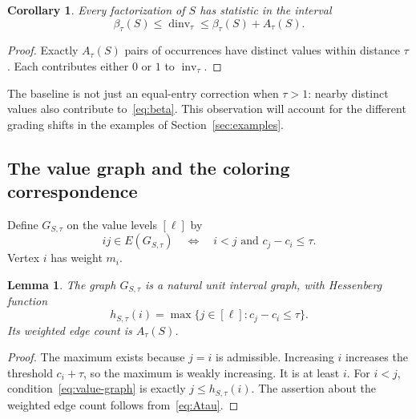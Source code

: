 \documentclass[11pt,reqno]{amsart}
\newcommand{\inv}{\operatorname{inv}}
\newcommand{\dinv}{\operatorname{dinv}}
\newtheorem{lemma}[theorem]{Lemma}
\newtheorem{corollary}[theorem]{Corollary}
\theoremstyle{definition}
\theoremstyle{remark}
\numberwithin{equation}{section}
\begin{document}
\begin{corollary}\label{cor:support}
Every factorization of $S$ has statistic in the interval
\[
 \beta_\tau(S)\leq\dinv_\tau\leq\beta_\tau(S)+A_\tau(S).
\]
\end{corollary}
\begin{proof}
Exactly $A_\tau(S)$ pairs of occurrences have distinct values within
distance $\tau$.  Each contributes either $0$ or $1$ to
$\inv_\tau$.
\end{proof}

The baseline is not just an equal-entry correction when $\tau>1$:
nearby distinct values also contribute to~\eqref{eq:beta}.  This
observation will account for the different grading shifts in the
examples of Section~\ref{sec:examples}.

\subsection{The value graph and the coloring correspondence}
Define $G_{S,\tau}$ on the value levels $[\ell]$ by
\begin{equation}\label{eq:value-graph}
 ij\in E(G_{S,\tau})\quad\Longleftrightarrow\quad
 i<j\text{ and }c_j-c_i\leq\tau.
\end{equation}
Vertex $i$ has weight $m_i$.

\begin{lemma}\label{lem:interval}
The graph $G_{S,\tau}$ is a natural unit interval graph, with
Hessenberg function
\begin{equation}\label{eq:value-h}
 h_{S,\tau}(i)=\max\{j\in[\ell]:c_j-c_i\leq\tau\}.
\end{equation}
Its weighted edge count is $A_\tau(S)$.
\end{lemma}
\begin{proof}
The maximum exists because $j=i$ is admissible.  Increasing $i$
increases the threshold $c_i+\tau$, so the maximum is weakly increasing.
It is at least $i$.  For $i<j$, condition~\eqref{eq:value-graph} is
exactly $j\leq h_{S,\tau}(i)$.  The assertion about the weighted edge
count follows from~\eqref{eq:Atau}.
\end{proof}
\end{document}
